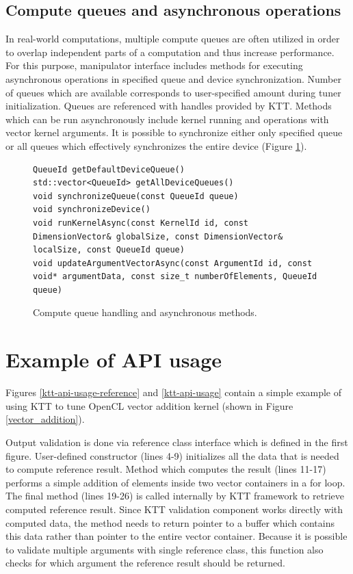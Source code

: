 \documentclass
[
    digital, %
    oneside, %
    table, %
    nolof, %
    nolot, %
    nocover %
]{fithesis3}
\begin{document}
\subsection{Compute queues and asynchronous operations}
In real-world computations, multiple compute queues are often utilized in order to overlap independent parts of a computation and thus increase
performance. For this purpose, manipulator interface includes methods for executing asynchronous operations in specified queue and device synchronization.
Number of queues which are available corresponds to user-specified amount during tuner initialization. Queues are referenced with handles provided by KTT.
Methods which can be run asynchronously include kernel running and operations with vector kernel arguments. It is possible to synchronize either only
specified queue or all queues which effectively synchronizes the entire device (Figure \ref{ktt-manipulator-asynchronous-methods}).

\begin{figure}
\begin{adjustwidth}{-1cm}{-1cm}
\begin{lstlisting}
QueueId getDefaultDeviceQueue()
std::vector<QueueId> getAllDeviceQueues()
void synchronizeQueue(const QueueId queue)
void synchronizeDevice()
void runKernelAsync(const KernelId id, const DimensionVector& globalSize, const DimensionVector& localSize, const QueueId queue)
void updateArgumentVectorAsync(const ArgumentId id, const void* argumentData, const size_t numberOfElements, QueueId queue)
\end{lstlisting}
\caption{Compute queue handling and asynchronous methods.}
\label{ktt-manipulator-asynchronous-methods}
\end{adjustwidth}
\end{figure}

\section{Example of API usage}
\label{ktt-simple-usage}
Figures \ref{ktt-api-usage-reference} and \ref{ktt-api-usage} contain a simple example of using KTT to tune OpenCL vector addition kernel (shown in
Figure \ref{vector_addition}).

Output validation is done via reference class interface which is defined in the first figure. User-defined constructor (lines 4-9) initializes all
the data that is needed to compute reference result. Method which computes the result (lines 11-17) performs a simple addition of elements inside
two vector containers in a for loop. The final method (lines 19-26) is called internally by KTT framework to retrieve computed reference result.
Since KTT validation component works directly with computed data, the method needs to return pointer to a buffer which contains this data rather than
pointer to the entire vector container. Because it is possible to validate multiple arguments with single reference class, this function also checks
for which argument the reference result should be returned.
\end{document}
